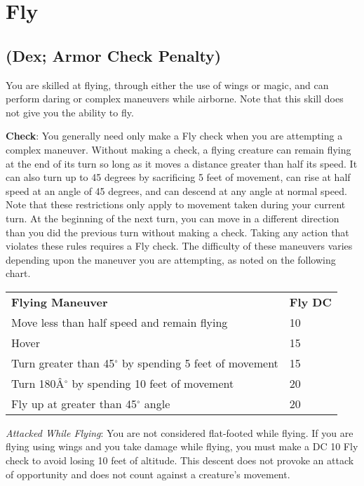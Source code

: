\section{Fly}

\label{f0}				
\subsection{(Dex; Armor Check Penalty)}

				
You are skilled at flying, through either the use of wings or magic, and can perform daring or complex maneuvers while airborne. Note that this skill does not give you the ability to fly.
				
\textbf{Check}: You generally need only make a Fly check when you are attempting a complex maneuver. Without making a check, a flying creature can remain flying at the end of its turn so long as it moves a distance greater than half its speed. It can also turn up to 45 degrees by sacrificing 5 feet of movement, can rise at half speed at an angle of 45 degrees, and can descend at any angle at normal speed. Note that these restrictions only apply to movement taken during your current turn. At the beginning of the next turn, you can move in a different direction than you did the previous turn without making a check. Taking any action that violates these rules requires a Fly check. The difficulty of these maneuvers varies depending upon the maneuver you are attempting, as noted on the following chart.

\begin{table}
 \sffamily
 \begin{tabularx}{\linewidth}{Xl}
\textbf{Flying Maneuver} & \textbf{Fly DC}\\
Move less than half speed and remain flying & 10\\
Hover & 15\\
Turn greater than 45\mbox{${}^\circ$} by spending 5 feet of movement & 15\\
Turn 180\^A\mbox{${}^\circ$} by spending 10 feet of movement & 20\\
Fly up at greater than 45\mbox{${}^\circ$} angle & 20\\  
 \end{tabularx}

\end{table}
				
\textit{Attacked While Flying}: You are not considered flat-footed while flying. If you are flying using wings and you take damage while flying, you must make a DC 10 Fly check to avoid losing 10 feet of altitude. This descent does not provoke an attack of opportunity and does not count against a creature's movement.
				

